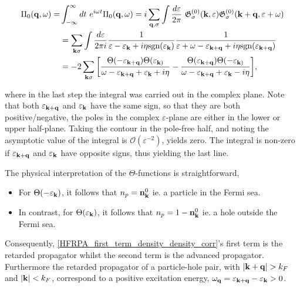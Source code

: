 \documentclass{homework}
\begin{document}
\begin{equation}
\begin{split}
    \Pi_0({\bf q}, \omega) =& \int_{-\infty}^{\infty} dt \textnormal{ } e^{i\omega t} \Pi_0({\bf q}, \omega) = i \sum_{{\bf q}, \sigma} \int \frac{d\varepsilon}{2\pi} \textnormal{ } \mathfrak{G}_{\sigma}^{(0)}({\bf k}, \varepsilon)  \mathfrak{G}_{\sigma}^{(0)}({\bf k+q}, \varepsilon+\omega)\\
    &= \sum_{{\bf k} \sigma} \int \frac{d\varepsilon}{2\pi i} \frac{1}{\varepsilon - \varepsilon_{{\bf k}} + i \eta \textnormal{sgn}(\varepsilon_{{\bf k}})} \frac{1}{\varepsilon + \omega - \varepsilon_{{\bf k+q}} + i \eta \textnormal{sgn}(\varepsilon_{{\bf k+q}})} \\
    &= -2 \sum_{{\bf k} \sigma} \bigg[ \frac{\Theta(-\varepsilon_{{\bf k+q}}) \Theta(\varepsilon_{{\bf k})}}{\omega - \varepsilon_{{\bf k+q}} + \varepsilon_{{\bf k}} + i\eta} - \frac{\Theta(\varepsilon_{{\bf k+q}}) \Theta(-\varepsilon_{{\bf k})}}{\omega - \varepsilon_{{\bf k+q}} + \varepsilon_{{\bf k}} - i\eta}\bigg],
\end{split}
\label{HFRPA_first_term_density_density_corr}
\end{equation}

where in the last step the integral was carried out in the complex plane. Note that both $\varepsilon_{{\bf k+q}}$ and $\varepsilon_{{\bf k}}$ have the same sign, so that they are both positive/negative, the poles in the complex $\varepsilon$-plane are either in the lower or upper half-plane. 
Taking the contour in the pole-free half, and noting the asymptotic value of the integral is $\mathcal{O}(\varepsilon^{-2})$, yields zero. The integral is non-zero if  $\varepsilon_{{\bf k+q}}$ and $\varepsilon_{{\bf k}}$ have opposite signs, thus yielding the last line. 

The physical interpretation of the $\Theta$-functions is straightforward, 

\begin{itemize}
    \item For $\Theta(-\varepsilon_{{\bf k}})$, it follows that $n_p = {\bf n}_{\bf k}^{0}$ ie. a particle in the Fermi sea.
    \item In contrast, for $\Theta(\varepsilon_{{\bf k}})$, it follows that $n_p = 1-{\bf n}_{\bf k}^{0}$ ie. a hole outside the Fermi sea.
\end{itemize}

Consequently, \cref{HFRPA_first_term_density_density_corr}'s first term is the retarded propagator whilst the second term is the advanced propagator. Furthermore the retarded propagator of a particle-hole pair, with $|{\bf k+q}| > k_F$ and $|{\bf k}|<k_F$, correspond to a positive excitation energy, $\omega_{{\bf q}} = \varepsilon_{{\bf k+q}} - \varepsilon_{{\bf k}} > 0$. \\
\end{document}
